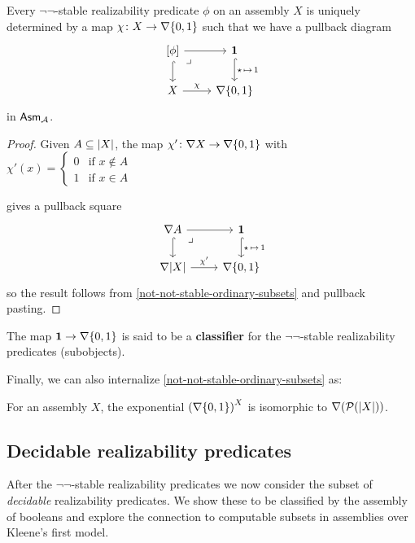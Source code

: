 \begin{proposition}\label{nabla-two-classifies-not-not-stable}
  Every \(\lnot\lnot\)-stable realizability predicate \(\phi\) on an assembly
  \(X\) is uniquely determined by a map \(\chi \colon X \to \nabla\set{0,1}\)
  such that we have a pullback diagram
  \[
    \begin{tikzcd}
      {[\phi]} \ar[r] \ar[d,hookrightarrow] \pbcorner
      & \One \ar[d,hookrightarrow,"{\singleton \,\mapsto\, 1}"] \\
      X \ar[r,"\chi"] & \nabla\set{0,1}
    \end{tikzcd}
  \]
  in \(\Asm{\AA}\).
\end{proposition}
\begin{proof}
  Given \(A \subseteq \carrier{X}\), the map
  \(
    \chi' \colon \nabla X \to \nabla\set{0,1}\) with \(\chi'(x)
    = \begin{cases}
      0 &\text{if } x \not\in A \\
      1 &\text{if } x \in A
    \end{cases}
    \)

  gives a pullback square
  \[
    \begin{tikzcd}
      \nabla A \ar[r] \ar[d,hookrightarrow] \pbcorner
      & \One \ar[d,hookrightarrow,"{\singleton \,\mapsto\, 1}"] \\
      \nabla\carrier{X} \ar[r,"\chi'"] & \nabla\set{0,1}
    \end{tikzcd}
  \]
  so the result follows from
  \cref{not-not-stable-ordinary-subsets} and pullback pasting.
\end{proof}

The map \(\One \to \nabla\set{0,1}\) is said to be a \textbf{classifier} for the
\(\lnot\lnot\)-stable realizability predicates (subobjects).

Finally, we can also internalize \cref{not-not-stable-ordinary-subsets} as:
\begin{exercise}\label{exer:nabla-two-nat-exp}
  For an assembly \(X\), the exponential \(\pa*{\nabla\set{0,1}}^X\) is
  isomorphic to \(\nabla(\powerset(\carrier{X}))\).
\end{exercise}

\subsection{Decidable realizability predicates}\label{sec:decidable-realizability-predicates}

After the \(\lnot\lnot\)-stable realizability predicates we now consider the
subset of \emph{decidable} realizability predicates. We show these to be
classified by the assembly of booleans and explore the connection to computable
subsets in assemblies over Kleene's first model.

